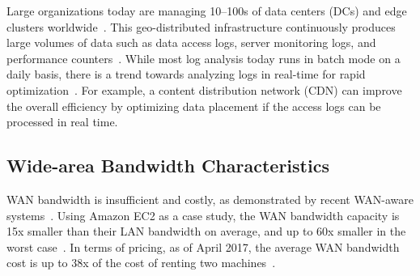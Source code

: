 
 Large organizations today are managing
10--100s of data centers (DCs) and edge clusters
worldwide~\cite{calder2013mapping}. This geo-distributed infrastructure
continuously produces large volumes of data such as data access logs, server
monitoring logs, and performance counters~\cite{pu2015low,
  alspaugh2014analyzing, vulimiri2015global}. While most log analysis today runs
in batch mode on a daily basis, there is a trend towards analyzing logs in
real-time for rapid optimization~\cite{rabkin2014aggregation}. For example, a
content distribution network (CDN) can improve the overall efficiency by
optimizing data placement if the access logs can be processed in real time.



\subsection{Wide-area Bandwidth Characteristics}
\label{sec:wide-area-bandwidth}

WAN bandwidth is insufficient and costly, as demonstrated by recent WAN-aware
systems~\cite{pu2015low, vulimiri2015global, vulimiri2015wananlytics,
  hsieh17gaia}. Using Amazon EC2 as a case study, the WAN bandwidth capacity is
15x smaller than their LAN bandwidth on average, and up to 60x smaller in the
worst case~\cite{hsieh17gaia}. In terms of pricing, as of April 2017, the
average WAN bandwidth cost is up to 38x of the cost of renting two
machines~\cite{amazon2017pricing}.

